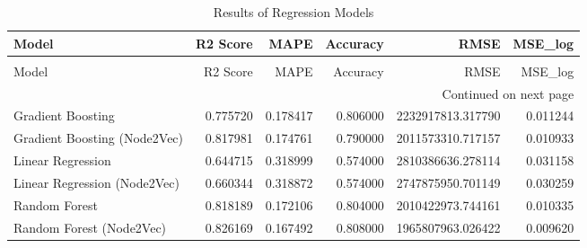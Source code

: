 \begin{longtable}{lrrrrr}
\caption{Results of Regression Models} \label{tab:regression_results} \\
\toprule
Model & R2 Score & MAPE & Accuracy & RMSE & MSE_log \\
\midrule
\endfirsthead
\caption[]{Results of Regression Models} \\
\toprule
Model & R2 Score & MAPE & Accuracy & RMSE & MSE_log \\
\midrule
\endhead
\midrule
\multicolumn{6}{r}{Continued on next page} \\
\midrule
\endfoot
\bottomrule
\endlastfoot
Gradient Boosting & 0.775720 & 0.178417 & 0.806000 & 2232917813.317790 & 0.011244 \\
Gradient Boosting (Node2Vec) & 0.817981 & 0.174761 & 0.790000 & 2011573310.717157 & 0.010933 \\
Linear Regression & 0.644715 & 0.318999 & 0.574000 & 2810386636.278114 & 0.031158 \\
Linear Regression (Node2Vec) & 0.660344 & 0.318872 & 0.574000 & 2747875950.701149 & 0.030259 \\
Random Forest & 0.818189 & 0.172106 & 0.804000 & 2010422973.744161 & 0.010335 \\
Random Forest (Node2Vec) & 0.826169 & 0.167492 & 0.808000 & 1965807963.026422 & 0.009620 \\
\end{longtable}
